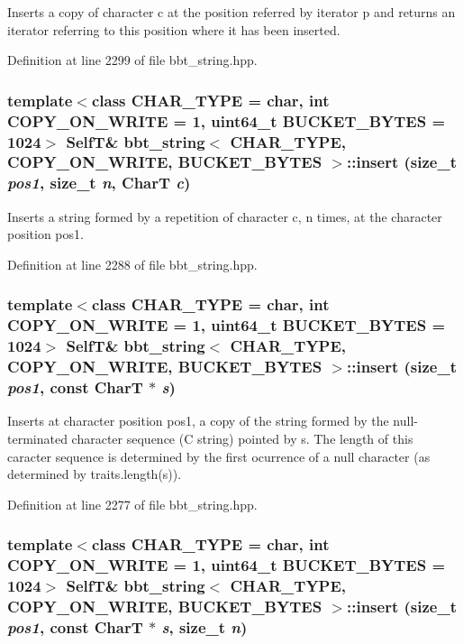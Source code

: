 Inserts a copy of character c at the position referred by iterator p and returns an iterator referring to this position where it has been inserted. 

Definition at line 2299 of file bbt\_\-string.hpp.\hypertarget{classbbt__string_414570f2f7f3afe8b105805a04f83e76}{
\subsubsection[{insert}]{\setlength{\rightskip}{0pt plus 5cm}template$<$class CHAR\_\-TYPE  = char, int COPY\_\-ON\_\-WRITE = 1, uint64\_\-t BUCKET\_\-BYTES = 1024$>$ {\bf SelfT}\& {\bf bbt\_\-string}$<$ CHAR\_\-TYPE, COPY\_\-ON\_\-WRITE, BUCKET\_\-BYTES $>$::insert (size\_\-t {\em pos1}, \/  size\_\-t {\em n}, \/  CharT {\em c})}}
\label{classbbt__string_414570f2f7f3afe8b105805a04f83e76}


Inserts a string formed by a repetition of character c, n times, at the character position pos1. 

Definition at line 2288 of file bbt\_\-string.hpp.\hypertarget{classbbt__string_3f5e4d3bbea5d9d55fe9fcb3185b7919}{
\subsubsection[{insert}]{\setlength{\rightskip}{0pt plus 5cm}template$<$class CHAR\_\-TYPE  = char, int COPY\_\-ON\_\-WRITE = 1, uint64\_\-t BUCKET\_\-BYTES = 1024$>$ {\bf SelfT}\& {\bf bbt\_\-string}$<$ CHAR\_\-TYPE, COPY\_\-ON\_\-WRITE, BUCKET\_\-BYTES $>$::insert (size\_\-t {\em pos1}, \/  const CharT $\ast$ {\em s})}}
\label{classbbt__string_3f5e4d3bbea5d9d55fe9fcb3185b7919}


Inserts at character position pos1, a copy of the string formed by the null-terminated character sequence (C string) pointed by s. The length of this caracter sequence is determined by the first ocurrence of a null character (as determined by traits.length(s)). 

Definition at line 2277 of file bbt\_\-string.hpp.\hypertarget{classbbt__string_0912d29c711b1f67e066d6bbf1203adc}{
\subsubsection[{insert}]{\setlength{\rightskip}{0pt plus 5cm}template$<$class CHAR\_\-TYPE  = char, int COPY\_\-ON\_\-WRITE = 1, uint64\_\-t BUCKET\_\-BYTES = 1024$>$ {\bf SelfT}\& {\bf bbt\_\-string}$<$ CHAR\_\-TYPE, COPY\_\-ON\_\-WRITE, BUCKET\_\-BYTES $>$::insert (size\_\-t {\em pos1}, \/  const CharT $\ast$ {\em s}, \/  size\_\-t {\em n})}}
\label{classbbt__string_0912d29c711b1f67e066d6bbf1203adc}


